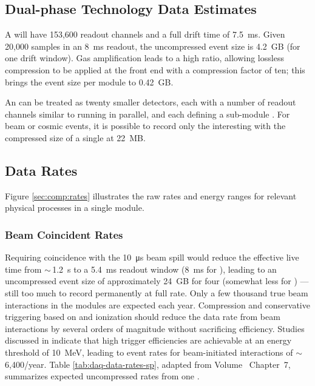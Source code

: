 \subsection{Dual-phase Technology Data Estimates}
\label{sec:exec-comp-dt-dptde}




A  will have 153,600 readout channels and a full drift time of \SI{7.5}{ms}. Given 20,000 samples in an \SI{8}{ms} readout, the uncompressed event size is \SI{4.2}{GB} (for one drift window).  Gas amplification leads to a high  ratio, allowing lossless compression to be applied at the front end  with a compression factor of ten; this brings the event size per module to \SI{.42}{GB}.

An    can be treated as twenty smaller  detectors, each with a number of readout channels similar to   
running in parallel,  and each defining a sub-module . For beam or cosmic events, it is possible to record only the interesting  with the compressed size of a single  at \SI{22}{MB}.

\subsection{Data Rates}
\label{sec:exec-comp-dt-dr}

Figure \ref{sec:comp:rates} illustrates the raw rates and energy ranges for relevant physical processes in a single   module. 


\subsubsection{Beam Coincident Rates}
\label{sec:exec-comp-dt-bcr}


 Requiring  coincidence with the \SI{10}{\micro\second}  beam spill would reduce the effective live time from $\sim\,$\SI{1.2}{s} to a \SI{5.4}{ms} readout window (\SI{8}{ms} for ), leading to an uncompressed event size of approximately \SI{24}{GB} for four  (somewhat less for ) --- still too much to record permanently at full rate. 
Only a few thousand true beam interactions in the  modules are expected each year.  Compression and conservative triggering based on  and ionization should reduce the data rate from beam interactions by several orders of magnitude without sacrificing efficiency.  Studies discussed in  \spchdaq{} indicate that high trigger efficiencies are achievable at an energy threshold of \SI{10}{MeV}, leading to event rates for beam-initiated  interactions of $\sim\,$6,400/year.
Table \ref{tab:daq-data-rates-sp}, adapted from Volume~\volnumbersp{} Chapter~7, 
 summarizes expected uncompressed rates from one . 

